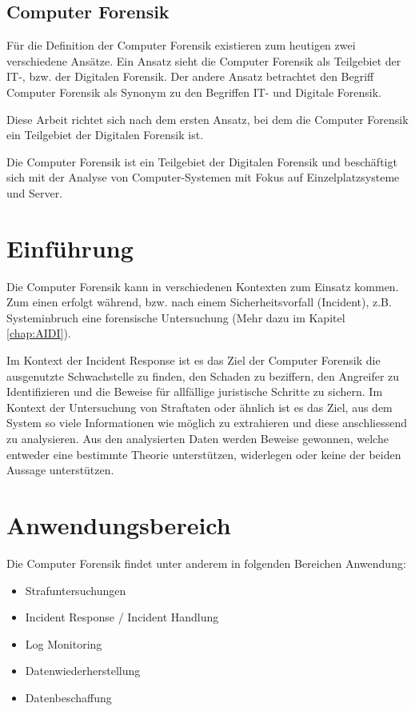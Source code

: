 \subsection{Computer Forensik}
Für die Definition der Computer Forensik existieren zum heutigen zwei verschiedene Ansätze. Ein Ansatz sieht die Computer Forensik als Teilgebiet der IT-, bzw. der Digitalen Forensik. Der andere Ansatz betrachtet den Begriff Computer Forensik als Synonym zu den Begriffen IT- und Digitale Forensik.

Diese Arbeit richtet sich nach dem ersten Ansatz, bei dem die Computer Forensik ein Teilgebiet der Digitalen Forensik ist.

Die Computer Forensik ist ein Teilgebiet der Digitalen Forensik und beschäftigt sich mit der Analyse von Computer-Systemen mit Fokus auf Einzelplatzsysteme und Server.

\section{Einführung}
Die Computer Forensik kann in verschiedenen Kontexten zum Einsatz kommen. Zum einen erfolgt während, bzw. nach einem Sicherheitsvorfall (Incident), z.B. Systeminbruch eine forensische Untersuchung (Mehr dazu im Kapitel \ref{chap:AIDI}). 

Im Kontext der Incident Response ist es das Ziel der Computer Forensik die ausgenutzte Schwachstelle zu finden, den Schaden zu beziffern, den Angreifer zu Identifizieren und die Beweise für allfällige juristische Schritte zu sichern. Im Kontext der Untersuchung von Straftaten oder ähnlich ist es das Ziel, aus dem System so viele Informationen wie möglich zu extrahieren und diese anschliessend zu analysieren. Aus den analysierten Daten werden Beweise gewonnen, welche entweder eine bestimmte Theorie unterstützen, widerlegen oder keine der beiden Aussage unterstützen. 


\section{Anwendungsbereich}
Die Computer Forensik findet unter anderem in folgenden Bereichen Anwendung:

\begin{itemize}
\item Strafuntersuchungen
\item Incident Response / Incident Handlung
\item Log Monitoring
\item Datenwiederherstellung
\item Datenbeschaffung
\end{itemize}


